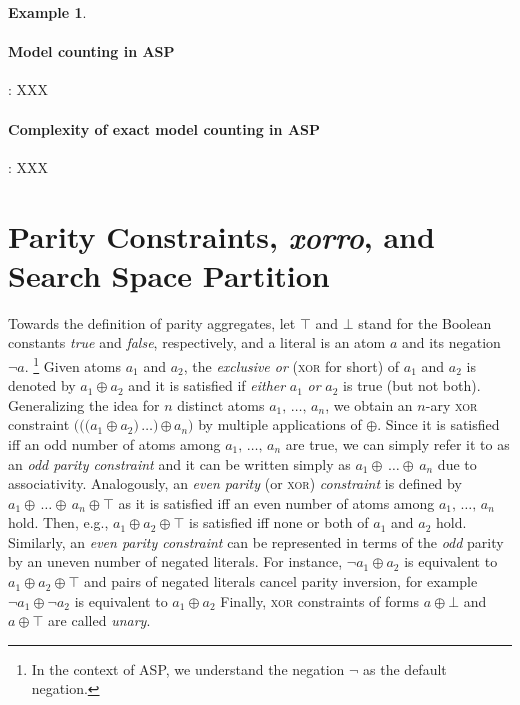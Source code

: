 \documentclass{article}
\newtheorem{example}{Example}
\newcommand{\XOR}{\textsc{xor}} %
\newcommand{\rg}[3]{{#1}{#2}\,\ldots{#2}\,{#3}}
\newcommand{\xor}{\oplus}
\newcommand{\true}{\top}
\newcommand{\false}{\bot}
\begin{document}
\begin{example}
\end{example}

\paragraph{Model counting in ASP}: XXX

\paragraph{Complexity of exact model counting in ASP}: XXX


\section{Parity Constraints, \emph{xorro}, and Search Space Partition} \label{sec:parity}

Towards the definition of parity aggregates, let $\true$ and $\false$
stand for the Boolean constants \emph{true} and \emph{false},
respectively, and a literal is an atom $a$ and its negation $\neg a$.
\footnote{In the context of ASP, we understand the negation $\neg$ as the default negation.}
%
Given atoms $a_1$ and $a_2$, the \emph{exclusive or}
(\XOR{} for short) of $a_1$ and $a_2$ is denoted by $a_1\xor a_2$ and
it is satisfied if \emph{either} $a_1$ \emph{or} $a_2$ is true (but
not both).
Generalizing the idea for $n$ distinct atoms
$\rg{a_1}{,}{a_n}$, we obtain an $n$-ary \XOR{} constraint
$\rg{(((a_1\xor a_2}{)}{\xor\,a_n)}$ by multiple applications of
$\xor$. Since it is satisfied iff an odd number of atoms among
$\rg{a_1}{,}{a_n}$ are true,
we can simply refer it to as an \emph{odd parity constraint}
and it can be written simply as
$\rg{a_1}{\xor}{a_n}$ due to associativity.
%
Analogously, an \emph{even parity} (or \XOR{}) \emph{constraint} is defined by
$\rg{a_1}{\xor}{a_n}\xor\true$ as it is satisfied iff an even number
of atoms among $\rg{a_1}{,}{a_n}$ hold. Then, e.g.,
%
$a_1\xor a_2\xor\true$
%
is satisfied iff none or both of $a_1$ and $a_2$ hold.
%
Similarly, an \emph{even parity constraint} can be represented in terms of the \emph{odd} parity by an uneven
number of negated literals.
For instance, $\neg a_1\xor a_2$ is equivalent to $a_1\xor a_2\xor\true$ and pairs of negated literals cancel parity inversion, for example $\neg a_1\xor \neg a_2$ is equivalent to $a_1\xor a_2$
Finally, \XOR{} constraints of forms $a\xor\false$ and $a\xor\true$
are called \emph{unary}.
\end{document}
